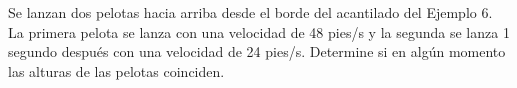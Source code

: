 \item Se lanzan dos pelotas hacia arriba desde el borde del acantilado del Ejemplo 6. La primera pelota se lanza con una velocidad de 48 pies/s y la segunda se lanza 1 segundo después con una velocidad de 24 pies/s. Determine si en algún momento las alturas de las pelotas coinciden.
